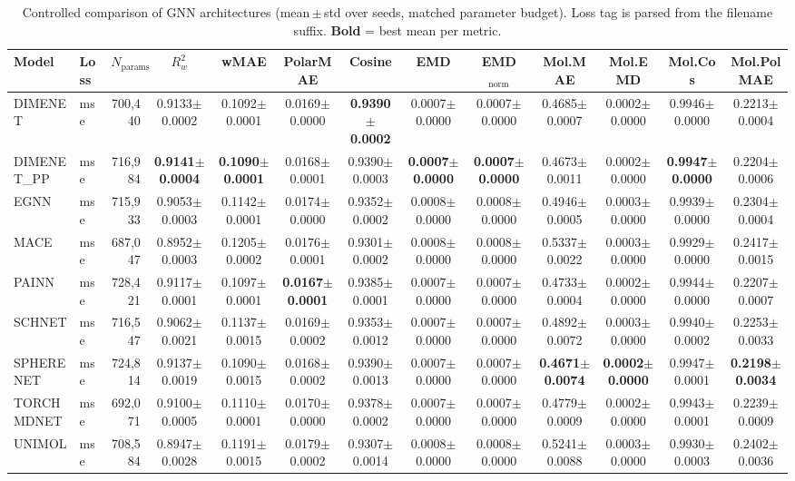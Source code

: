 \begin{table}[ht]
\centering
\caption{Controlled comparison of GNN architectures (mean\,$\pm$\,std over seeds, matched parameter budget). Loss tag is parsed from the filename suffix. \textbf{Bold} = best mean per metric.}
\label{tab:benchmark}
\small
\begin{tabular}{l l r c c c c c c c c c c }
\toprule
Model & Loss & $N_{\text{params}}$ & $R^2_w$ & wMAE & PolarMAE & Cosine & EMD & EMD$_\mathrm{norm}$ & Mol.MAE & Mol.EMD & Mol.Cos & Mol.PolMAE \\
\midrule
DIMENET & mse & 700,440 & 0.9133$\pm$0.0002 & 0.1092$\pm$0.0001 & 0.0169$\pm$0.0000 & \textbf{0.9390$\pm$0.0002} & 0.0007$\pm$0.0000 & 0.0007$\pm$0.0000 & 0.4685$\pm$0.0007 & 0.0002$\pm$0.0000 & 0.9946$\pm$0.0000 & 0.2213$\pm$0.0004 \\
DIMENET_PP & mse & 716,984 & \textbf{0.9141$\pm$0.0004} & \textbf{0.1090$\pm$0.0001} & 0.0168$\pm$0.0001 & 0.9390$\pm$0.0003 & \textbf{0.0007$\pm$0.0000} & \textbf{0.0007$\pm$0.0000} & 0.4673$\pm$0.0011 & 0.0002$\pm$0.0000 & \textbf{0.9947$\pm$0.0000} & 0.2204$\pm$0.0006 \\
EGNN & mse & 715,933 & 0.9053$\pm$0.0003 & 0.1142$\pm$0.0001 & 0.0174$\pm$0.0000 & 0.9352$\pm$0.0002 & 0.0008$\pm$0.0000 & 0.0008$\pm$0.0000 & 0.4946$\pm$0.0005 & 0.0003$\pm$0.0000 & 0.9939$\pm$0.0000 & 0.2304$\pm$0.0004 \\
MACE & mse & 687,047 & 0.8952$\pm$0.0003 & 0.1205$\pm$0.0002 & 0.0176$\pm$0.0001 & 0.9301$\pm$0.0002 & 0.0008$\pm$0.0000 & 0.0008$\pm$0.0000 & 0.5337$\pm$0.0022 & 0.0003$\pm$0.0000 & 0.9929$\pm$0.0000 & 0.2417$\pm$0.0015 \\
PAINN & mse & 728,421 & 0.9117$\pm$0.0001 & 0.1097$\pm$0.0001 & \textbf{0.0167$\pm$0.0001} & 0.9385$\pm$0.0001 & 0.0007$\pm$0.0000 & 0.0007$\pm$0.0000 & 0.4733$\pm$0.0004 & 0.0002$\pm$0.0000 & 0.9944$\pm$0.0000 & 0.2207$\pm$0.0007 \\
SCHNET & mse & 716,547 & 0.9062$\pm$0.0021 & 0.1137$\pm$0.0015 & 0.0169$\pm$0.0002 & 0.9353$\pm$0.0012 & 0.0007$\pm$0.0000 & 0.0007$\pm$0.0000 & 0.4892$\pm$0.0072 & 0.0003$\pm$0.0000 & 0.9940$\pm$0.0002 & 0.2253$\pm$0.0033 \\
SPHERENET & mse & 724,814 & 0.9137$\pm$0.0019 & 0.1090$\pm$0.0015 & 0.0168$\pm$0.0002 & 0.9390$\pm$0.0013 & 0.0007$\pm$0.0000 & 0.0007$\pm$0.0000 & \textbf{0.4671$\pm$0.0074} & \textbf{0.0002$\pm$0.0000} & 0.9947$\pm$0.0001 & \textbf{0.2198$\pm$0.0034} \\
TORCHMDNET & mse & 692,071 & 0.9100$\pm$0.0005 & 0.1110$\pm$0.0001 & 0.0170$\pm$0.0000 & 0.9378$\pm$0.0002 & 0.0007$\pm$0.0000 & 0.0007$\pm$0.0000 & 0.4779$\pm$0.0009 & 0.0002$\pm$0.0000 & 0.9943$\pm$0.0001 & 0.2239$\pm$0.0009 \\
UNIMOL & mse & 708,584 & 0.8947$\pm$0.0028 & 0.1191$\pm$0.0015 & 0.0179$\pm$0.0002 & 0.9307$\pm$0.0014 & 0.0008$\pm$0.0000 & 0.0008$\pm$0.0000 & 0.5241$\pm$0.0088 & 0.0003$\pm$0.0000 & 0.9930$\pm$0.0003 & 0.2402$\pm$0.0036 \\
\bottomrule
\end{tabular}
\end{table}
